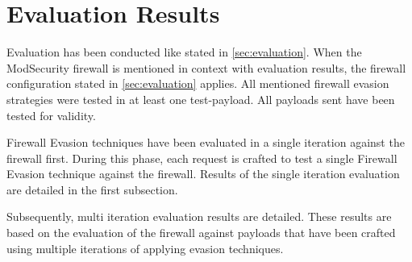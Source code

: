 \section{Evaluation Results}
\label{sec:EvaluationResults}
Evaluation has been conducted like stated in \ref{sec:evaluation}. 
When the ModSecurity firewall is mentioned in context with evaluation results, the firewall configuration stated in \ref{sec:evaluation} applies. 
All mentioned firewall evasion strategies were tested in at least one test-payload.
All payloads sent have been tested for validity.

Firewall Evasion techniques have been evaluated in a single iteration against the firewall first. During this phase, each request is crafted to test a single Firewall Evasion technique against the firewall. Results of the single iteration evaluation are detailed in the first subsection. 

Subsequently, multi iteration evaluation results are detailed. These results are based on the evaluation of the firewall against payloads that have been crafted using multiple iterations of applying evasion techniques.

%
